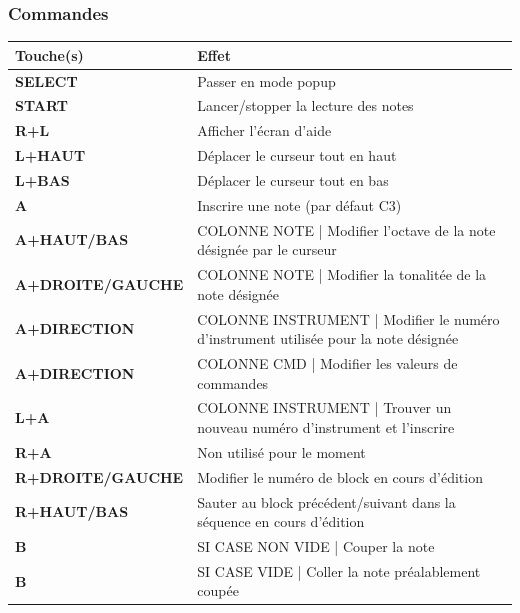\documentclass[12pt,a4paper]{article}
\begin{document}
        \subsubsection{Commandes}
        \tablelasttail{\hline}
        \begin{tabular}{|l|p{11cm}|}
        \hline
            \rowcolor{headertab} {\bf Touche(s)} & {\bf Effet} \\
            \hline
            {\bf SELECT} & Passer en mode popup \\
            \hline
            {\bf START} & Lancer/stopper la lecture des notes \\
            \hline
            {\bf R+L} & Afficher l'écran d'aide \\
            \hline
            {\bf L+HAUT} & Déplacer le curseur tout en haut \\
            \hline
            {\bf L+BAS} & Déplacer le curseur tout en bas \\
            \hline
            {\bf A} & Inscrire une note (par défaut C3) \\
            \hline
            {\bf A+HAUT/BAS} & COLONNE NOTE | Modifier l'octave de la note désignée par le curseur \\
            \hline
            {\bf A+DROITE/GAUCHE} & COLONNE NOTE | Modifier la tonalitée de la note désignée \\
            \hline
            {\bf A+DIRECTION} & COLONNE INSTRUMENT | Modifier le numéro d'instrument utilisée pour la note désignée \\
            \hline
            {\bf A+DIRECTION} & COLONNE CMD | Modifier les valeurs de commandes \\
            \hline
            {\bf L+A} & COLONNE INSTRUMENT | Trouver un nouveau numéro d'instrument et l'inscrire \\
            \hline
            {\bf R+A} & Non utilisé pour le moment \\
            \hline
            {\bf R+DROITE/GAUCHE} & Modifier le numéro de block en cours d'édition \\
            \hline
            {\bf R+HAUT/BAS} & Sauter au block précédent/suivant dans la séquence en cours d'édition \\
            \hline
            {\bf B} & SI CASE NON VIDE | Couper la note \\
            \hline
            {\bf B} & SI CASE VIDE | Coller la note préalablement coupée \\
        \hline
        \end{tabular}
\end{document}
